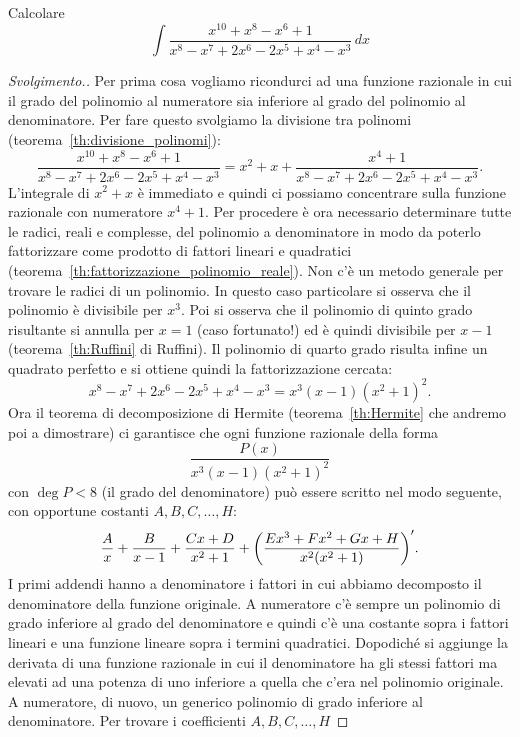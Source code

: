 \begin{example}
  Calcolare
  \[
   \int \frac{x^{10}+x^8-x^6+1}{x^8-x^7+2x^6-2x^5+x^4-x^3}\, dx
  \]
\end{example}
\begin{proof}[Svolgimento.]
Per prima cosa vogliamo ricondurci ad una funzione razionale
in cui il grado del polinomio al numeratore sia inferiore
al grado del polinomio al denominatore. Per fare questo svolgiamo
la divisione tra polinomi
(teorema~\ref{th:divisione_polinomi}):
\[
  \frac{x^{10}+x^8-x^6+1}{x^8-x^7+2x^6-2x^5+x^4-x^3}
  = x^2 + x + \frac{x^4+1}{x^8-x^7+2x^6-2x^5+x^4-x^3}.
\]
L'integrale di $x^2+x$ è immediato e quindi ci possiamo concentrare
sulla funzione razionale con numeratore $x^4+1$.
Per procedere è ora necessario determinare tutte le radici, reali e complesse, del polinomio a denominatore in modo da poterlo fattorizzare
come prodotto di fattori lineari e quadratici
(teorema~\ref{th:fattorizzazione_polinomio_reale}).
Non c'è un metodo generale per trovare le radici di un polinomio.
In questo caso particolare si osserva
che il polinomio è divisibile per $x^3$. Poi si osserva che il polinomio
di quinto grado risultante si annulla per $x=1$ (caso fortunato!) ed
è quindi divisibile per $x-1$ (teorema~\ref{th:Ruffini} di Ruffini).
Il polinomio di quarto grado
risulta infine un quadrato perfetto e si ottiene quindi la fattorizzazione
cercata:
\[
x^8-x^7+2x^6-2x^5+x^4-x^3 = x^3(x-1)(x^2+1)^2.
\]
Ora il teorema di decomposizione di Hermite (teorema~\ref{th:Hermite} che andremo poi a dimostrare)
ci garantisce che ogni funzione razionale della forma
\[
\frac{P(x)}{x^3(x-1)(x^2+1)^2}
\]
con $\deg P < 8$ (il grado del denominatore) può essere
scritto nel modo seguente, con
opportune costanti $A,B,C,\dots,H$:
\begin{equation}\label{eq:438943}
  \frac{A}{x} + \frac{B}{x-1} + \frac{Cx+D}{x^2+1}
  + {\left( \frac{Ex^3 + Fx^2 + G x + H}{x^2(x^2+1)} \right)}'.
\end{equation}
I primi addendi hanno a denominatore i fattori in cui abbiamo
decomposto il denominatore della funzione originale. A numeratore
c'è sempre un polinomio di grado inferiore al grado del denominatore
e quindi c'è una costante sopra i fattori lineari e una funzione lineare
sopra i termini quadratici. Dopodiché si aggiunge la derivata di una funzione
razionale in cui il denominatore ha gli stessi fattori ma elevati ad una
potenza di uno inferiore a quella che c'era nel polinomio originale.
A numeratore, di nuovo, un generico polinomio di grado inferiore al denominatore.
Per trovare i coefficienti $A,B,C, \dots, H$ 

\end{proof}
